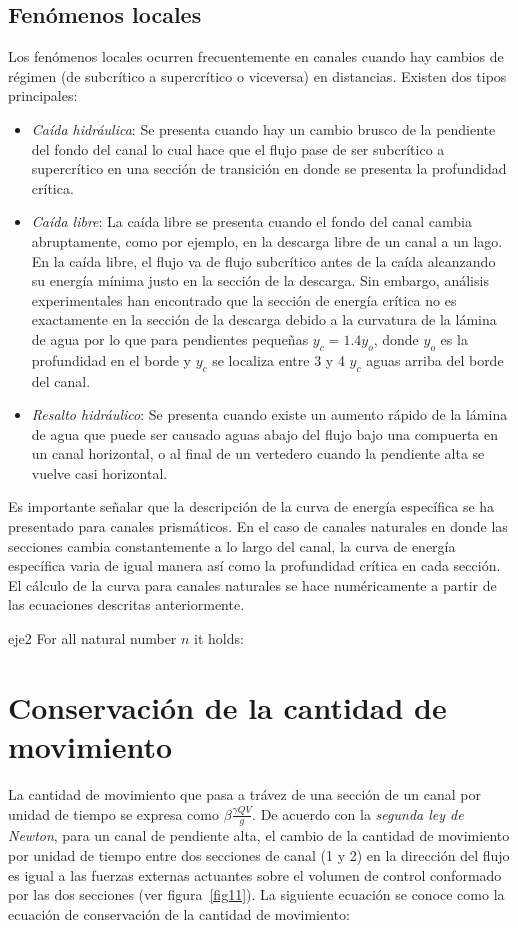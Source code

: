 \documentclass[11pt, oneside]{article}
\begin{document}
\subsection{Fen\'omenos locales}
Los fen\'omenos locales ocurren frecuentemente en canales cuando hay cambios de r\'egimen (de subcr\'itico a supercr\'itico o viceversa) en distancias. Existen dos tipos principales:
\begin{itemize}
\item \emph{Ca\'ida hidr\'aulica}: Se presenta cuando hay un cambio brusco de la pendiente del fondo del canal lo cual hace que el flujo pase de ser subcr\'itico a supercr\'itico en una secci\'on de transici\'on en donde se presenta  la profundidad cr\'itica. 
\item \emph{Ca\'ida libre}: La ca\'ida libre se presenta cuando el fondo del canal cambia abruptamente, como por ejemplo, en la descarga libre de un canal a un lago. En la ca\'ida libre, el flujo va de flujo subcr\'itico antes de la ca\'ida alcanzando su energ\'ia m\'inima justo en la secci\'on de la descarga. Sin embargo, an\'alisis experimentales han encontrado que la secci\'on de energ\'ia cr\'itica no es exactamente en la secci\'on de la descarga debido a la curvatura de la l\'amina de agua por lo que para pendientes pequeñas $y_c = 1.4 y_o$, donde $y_o$ es la profundidad en el borde y $y_c$ se localiza entre 3 y 4 $y_c$ aguas arriba del borde del canal.
\item \emph{Resalto hidr\'aulico}: Se presenta cuando existe un aumento r\'apido de la l\'amina de agua que puede ser causado aguas abajo del flujo bajo una compuerta  en un canal horizontal, o al final de un vertedero cuando la pendiente alta se vuelve casi horizontal. 
\end{itemize}
Es importante señalar que la descripci\'on de la curva de energ\'ia espec\'ifica se ha presentado para canales prism\'aticos. En el caso de canales naturales en donde las secciones cambia constantemente a lo largo del canal, la curva de energ\'ia espec\'ifica varia de igual manera as\'i como la profundidad cr\'itica en cada secci\'on. El c\'alculo de la curva para canales naturales se hace num\'ericamente a partir de las ecuaciones descritas anteriormente. 

\begin{eje}{}{eje2}
  For all natural number $n$ it holds:
\end{eje}

\section{Conservaci\'on de la cantidad de movimiento}%
La cantidad de movimiento que pasa a tr\'avez de una secci\'on de un canal por unidad de tiempo se expresa como $\beta\frac{ \gamma Q V}{g}$. De acuerdo con la \emph{segunda ley de Newton}, para un canal de pendiente alta, el cambio de la cantidad de movimiento por unidad de tiempo entre dos secciones de canal (1 y 2) en la direcci\'on del flujo es igual a las fuerzas externas actuantes sobre el volumen de control conformado por las dos secciones (ver figura~\ref{fig11}). La siguiente ecuaci\'on se conoce como la ecuaci\'on de conservaci\'on de la cantidad de movimiento:
\end{document}
